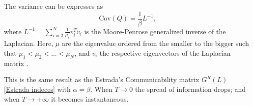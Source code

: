 The variance can be expresses as
\begin{equation}\label{classic_correlation}
    \mathrm{Cov}(Q) = \frac{1}{\beta}L^{-1},
\end{equation}
where ${L}^{-1} = \sum_{i=2}^N \frac{1}{\mu_i}v_i^Tv_i$ is the Moore-Penrose generalized inverse of the Laplacian. Here, $\mu$ are the eigenvalue ordered from the smaller to the bigger such that $\mu_1 < \mu_2 < ... < \mu_N$, and $v_i$ the respective eigenvectors of the Laplacian matrix \cite{Generalized_inverse_Laplacian}.

This is the same result as the Estrada's Communicability matrix $G^R(L)$ \eqref{Estrada indeces} with $\alpha=\beta$.
When $T\rightarrow 0$ the spread of information drops; and when $T\rightarrow +\infty$ it becomes instantaneous.